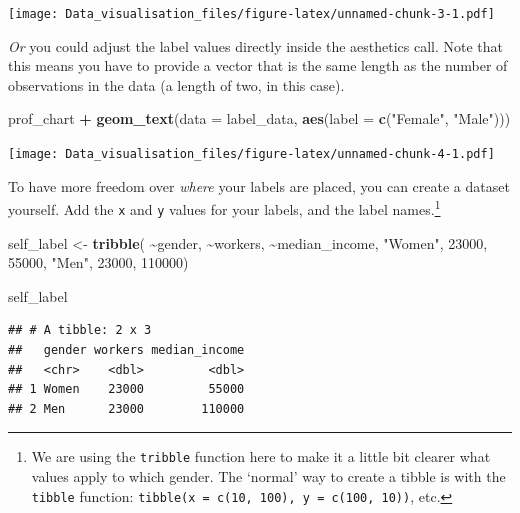 \documentclass[
]{book}
\newenvironment{Shaded}{\begin{snugshade}}{\end{snugshade}}
\newcommand{\DataTypeTok}[1]{\textcolor[rgb]{0.13,0.29,0.53}{#1}}
\newcommand{\DecValTok}[1]{\textcolor[rgb]{0.00,0.00,0.81}{#1}}
\newcommand{\KeywordTok}[1]{\textcolor[rgb]{0.13,0.29,0.53}{\textbf{#1}}}
\newcommand{\NormalTok}[1]{#1}
\newcommand{\OperatorTok}[1]{\textcolor[rgb]{0.81,0.36,0.00}{\textbf{#1}}}
\newcommand{\StringTok}[1]{\textcolor[rgb]{0.31,0.60,0.02}{#1}}
\begin{document}
\texttt{[image: Data\_visualisation\_files/figure-latex/unnamed-chunk-3-1.pdf]}

\emph{Or} you could adjust the label values directly inside the aesthetics call. Note that this means you have to provide a vector that is the same length as the number of observations in the data (a length of two, in this case).

\begin{Shaded}
\begin{Highlighting}[]
\NormalTok{prof\_chart }\OperatorTok{+}
\StringTok{  }\KeywordTok{geom\_text}\NormalTok{(}\DataTypeTok{data =}\NormalTok{ label\_data,}
            \KeywordTok{aes}\NormalTok{(}\DataTypeTok{label =} \KeywordTok{c}\NormalTok{(}\StringTok{"Female"}\NormalTok{, }\StringTok{"Male"}\NormalTok{)))}
\end{Highlighting}
\end{Shaded}

\texttt{[image: Data\_visualisation\_files/figure-latex/unnamed-chunk-4-1.pdf]}

To have more freedom over \emph{where} your labels are placed, you can create a dataset yourself. Add the \texttt{x} and \texttt{y} values for your labels, and the label names.\footnote{We are using the \texttt{tribble} function here to make it a little bit clearer what values apply to which gender. The `normal' way to create a tibble is with the \texttt{tibble} function: \texttt{tibble(x\ =\ c(10,\ 100),\ y\ =\ c(100,\ 10))}, etc.}

\begin{Shaded}
\begin{Highlighting}[]
\NormalTok{self\_label \textless{}{-}}\StringTok{ }\KeywordTok{tribble}\NormalTok{(}
  \OperatorTok{\textasciitilde{}}\NormalTok{gender, }\OperatorTok{\textasciitilde{}}\NormalTok{workers,   }\OperatorTok{\textasciitilde{}}\NormalTok{median\_income,}
  \StringTok{"Women"}\NormalTok{,    }\DecValTok{23000}\NormalTok{,            }\DecValTok{55000}\NormalTok{,}
  \StringTok{"Men"}\NormalTok{,      }\DecValTok{23000}\NormalTok{,           }\DecValTok{110000}\NormalTok{)}


\NormalTok{self\_label}
\end{Highlighting}
\end{Shaded}

\begin{verbatim}
## # A tibble: 2 x 3
##   gender workers median_income
##   <chr>    <dbl>         <dbl>
## 1 Women    23000         55000
## 2 Men      23000        110000
\end{verbatim}
\end{document}

